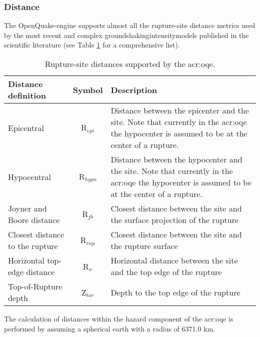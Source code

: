 \subsubsection{Distance}
%
The OpenQuake-engine supports almost all the rupture-site 
distance metrics used by the most recent and complex 
\glspl{groundshakingintensitymodel} published in the scientific 
literature (see Table \ref{tab:distances} for a comprehensive list).
\begin{table}[!t]
\centering
\begin{tabular}{|p{4.5cm}cp{7.5cm}|}
\hline
\rowcolor{anti-flashwhite}
\bf{Distance definition} & \bf{Symbol} & \bf{Description} \\
\hline 
Epicentral & R$_{epi}$ & Distance between the epicenter and the site. 
                         Note that currently in the \gls{acr:oqe} the 
                         hypocenter is assumed to be at the center of 
                         a rupture.\\
Hypocentral & R$_{hypo}$ & Distance between the hypocenter and the site. 
                           Note that currently in the \gls{acr:oqe} the 
                           hypocenter is assumed to be at the center of 
                           a rupture.\\
Joyner and Boore distance & R$_{jb}$ & Closest distance between the site and 
                                       the surface projection of the rupture \\
Closest distance to the rupture & R$_{rup}$ & Closest distance between 
                                              the site and the rupture 
                                              surface \\
Horizontal top-edge distance & R$_{x}$ & Horizontal distance between the site 
                                         and the top edge of the rupture \\
Top-of-Rupture depth & Z$_{tor}$ & Depth to the top edge of the rupture \\
\hline
\end{tabular}
\caption{Rupture-site distances supported by the \gls{acr:oqe}.}
\label{tab:distances}
\end{table}
The calculation of distances within the hazard component of the \gls{acr:oqe} 
is performed by assuming a spherical earth with a radius of 6371.0 km. 

